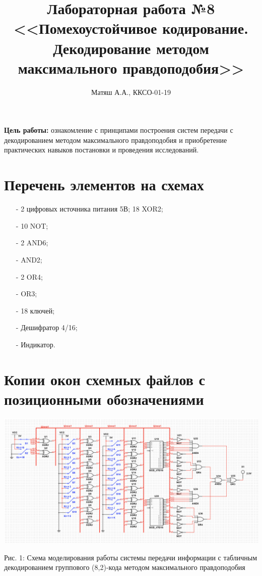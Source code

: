 \documentclass[14pt]{article}
\title{\textbf{Лабораторная работа №8\\
<<Помехоустойчивое кодирование. Декодирование методом максимального правдоподобия>>}}
\author{Матяш А.А., ККСО-01-19}
\date{}
\begin{document}
\maketitle
\thispagestyle{empty}
\textbf{Цель работы:} ознакомление с принципами построения систем передачи с декодированием методом максимального правдоподобия и приобретение практических навыков постановки и проведения исследований.\\
\section{Перечень элементов на схемах}
\begin{itemize}
    \item[-] 2 цифровых источника питания 5В; 18 XOR2;
    \item[-] 10 NOT;
    \item[-] 2 AND6;
    \item[-] AND2;
    \item[-] 2 OR4;
    \item[-] OR3;
    \item[-] 18 ключей; 
    \item[-] Дешифратор 4/16; 
    \item[-] Индикатор.
\end{itemize}
\section{Копии окон схемных файлов с позиционными обозначениями}
\includegraphics[width=1\linewidth]{scheme.png}
\begin{center}
    Рис. 1: Схема моделирования работы системы передачи информации с табличным декодированием группового (8,2)-кода методом максимального правдоподобия\\
\end{center}
\end{document}
